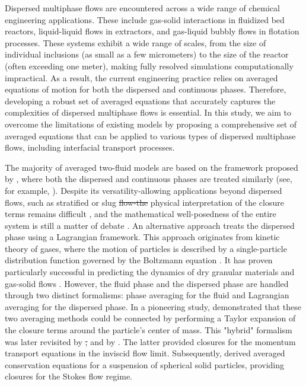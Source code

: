 \documentclass[11pt]{My_preprint}
\providecommand{\DIFadd}[1]{{\protect\color{blue}\uwave{#1}}} %
\providecommand{\DIFdel}[1]{{\protect\color{red}\sout{#1}}}                      %
\providecommand{\DIFaddbegin}{} %
\providecommand{\DIFaddend}{} %
\providecommand{\DIFdelbegin}{} %
\providecommand{\DIFdelend}{} %
\begin{document}
Dispersed multiphase flows are encountered across a wide range of chemical engineering applications. 
These include gas-solid interactions in fluidized bed reactors, liquid-liquid flows in extractors, and gas-liquid bubbly flows in flotation processes. 
These systems exhibit a wide range of scales, from the size of individual inclusions (as small as a few micrometers) to the size of the reactor (often exceeding one meter), making fully resolved simulations computationally impractical. 
As a result, the current engineering practice relies on averaged equations of motion for both the dispersed and continuous phases. 
Therefore, developing a robust set of averaged equations that accurately captures the complexities of dispersed multiphase flows is essential. 
In this study, we aim to overcome the limitations of existing models by proposing a comprehensive set of averaged equations that can be applied to various types of dispersed multiphase flows, including interfacial transport processes.





The majority of averaged two-fluid models are based on the framework proposed by \citet{drew1983mathematical}, where both the dispersed and continuous phases are treated similarly (see, for example, \citet{hu2021cfd}). 
Despite its versatility-allowing applications beyond dispersed flows, such as stratified or slug \DIFdelbegin \DIFdel{flow-the }\DIFdelend \DIFaddbegin \DIFadd{flow, the }\DIFaddend physical interpretation of the closure terms remains difficult \citep{drew1983mathematical}, and the mathematical well-posedness of the entire system is still a matter of debate \citep{panicker2018hyperbolicity, lhuillier2013}.
An alternative approach treats the dispersed phase using a Lagrangian framework. 
This approach originates from \DIFaddbegin \DIFadd{the }\DIFaddend kinetic theory of gases, where the motion of particles is described by a single-particle distribution function governed by the Boltzmann equation \citep{chapman1990mathematical}. 
It has proven particularly successful in predicting the dynamics of dry granular materials \citep{rao2008introduction} and gas-solid flows \citep{simonin1996}. 
However, the fluid phase and the dispersed phase are handled through two distinct formalisms: phase averaging for the fluid and Lagrangian averaging for the dispersed phase.
In a pioneering study, \citet{buyevich1979flow} demonstrated that these two averaging methods could be connected by performing a Taylor expansion of the closure terms around the particle’s center of mass. 
This "hybrid" formalism was later revisited by \citet{lhuillier1992ensemble} \DIFdelbegin \DIFdel{, }\DIFdelend and by \citet{zhang1994averaged, zhang1994ensemble}. The latter provided closures for the momentum transport equations in the inviscid flow limit. 
Subsequently, \citet{jackson1997locally} derived averaged conservation equations for a suspension of spherical solid particles, providing closures for the Stokes flow regime.
\end{document}
